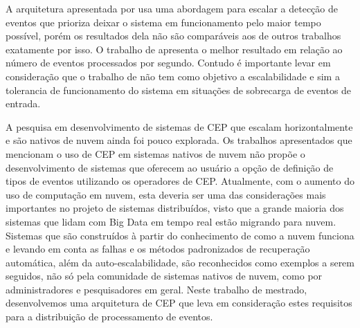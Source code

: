 A arquitetura apresentada por \cite{6906776} usa uma abordagem para escalar a detecção de eventos que prioriza deixar o sistema em funcionamento pelo maior tempo possível, porém os resultados dela não são comparáveis aos de outros trabalhos exatamente por isso. O trabalho de \cite{Isoyama:2012:SCE:2335484.2335498} apresenta o melhor resultado em relação ao número de eventos processados por segundo. Contudo é importante levar em consideração que o trabalho de \cite{6906776} não tem como objetivo a escalabilidade e sim a tolerancia de funcionamento do sistema em situações de sobrecarga de eventos de entrada.



A pesquisa em desenvolvimento de sistemas de CEP que escalam horizontalmente e são nativos de nuvem ainda foi pouco explorada. Os trabalhos apresentados que mencionam o uso de CEP em sistemas nativos de nuvem não propõe o desenvolvimento de sistemas que oferecem ao usuário a opção de definição de tipos de eventos utilizando os operadores de CEP. Atualmente, com o aumento do uso de computação em nuvem, esta deveria ser uma das considerações mais importantes no projeto de sistemas distribuídos, visto que a grande maioria dos sistemas que lidam com Big Data em tempo real estão migrando para nuvem. Sistemas que são construídos à partir do conhecimento de como a nuvem funciona e levando em conta as falhas e os métodos padronizados de recuperação automática, além da auto-escalabilidade, são reconhecidos como exemplos a serem seguidos, não só pela comunidade de sistemas nativos de nuvem, como por administradores e pesquisadores em geral.
Neste trabalho de mestrado, desenvolvemos uma arquitetura de CEP que leva em consideração estes requisitos para a distribuição de processamento de eventos.




